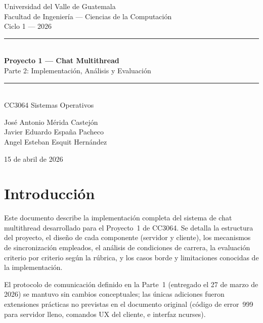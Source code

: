 \documentclass[12pt,a4paper]{article}
\begin{document}
\begin{titlepage}
\centering
\vspace*{2cm}
{\large Universidad del Valle de Guatemala\\
Facultad de Ingeniería --- Ciencias de la Computación\\
Ciclo 1 --- 2026\\[1cm]}

\rule{\textwidth}{1pt}\\[0.4cm]
{\Huge\bfseries Proyecto 1 --- Chat Multithread\\[0.2cm]}
{\Large Parte 2: Implementación, Análisis y Evaluación}\\[0.2cm]
\rule{\textwidth}{1pt}\\[1cm]

{\large CC3064 Sistemas Operativos\\[2cm]}

{\large
José Antonio Mérida Castejón\\
Javier Eduardo España Pacheco\\
Angel Esteban Esquit Hernández\\[2cm]}

{\large 15 de abril de 2026}
\end{titlepage}

\tableofcontents
\newpage

\section{Introducción}

Este documento describe la implementación completa del sistema de chat multithread
desarrollado para el Proyecto~1 de CC3064.  Se detalla la estructura del proyecto,
el diseño de cada componente (servidor y cliente), los mecanismos de sincronización
empleados, el análisis de condiciones de carrera, la evaluación criterio por criterio
según la rúbrica, y los casos borde y limitaciones conocidas de la implementación.

El protocolo de comunicación definido en la Parte~1 (entregado el 27 de marzo de
2026) se mantuvo sin cambios conceptuales; las únicas adiciones fueron extensiones
prácticas no previstas en el documento original (código de error~999 para servidor
lleno, comandos UX del cliente, e interfaz ncurses).

\end{document}
